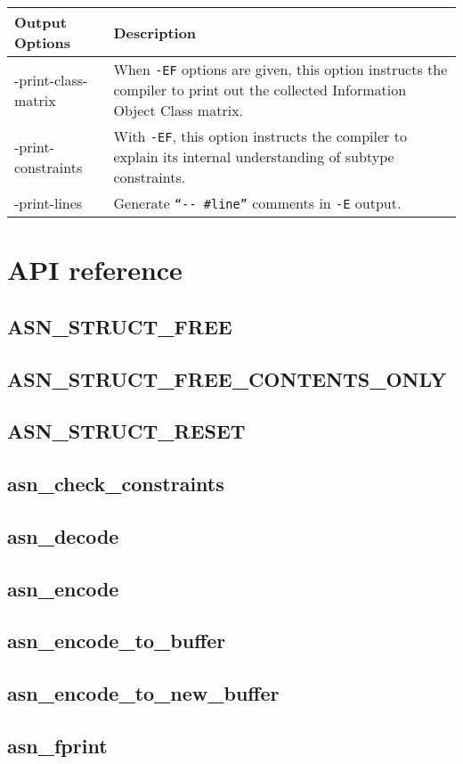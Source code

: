 \documentclass[english,oneside,12pt]{book}
\begin{document}
\begin{longtable}{lp{4in}}
\textbf{Output Options} & \textbf{Description}\\
\midrule
{\ttfamily -print-class-matrix} & {\small When \texttt{-EF} options are given, this option instructs the compiler to print out the collected Information Object Class matrix.}\\
{\ttfamily -print-constraints} & {\small With \texttt{-EF}, this option instructs the compiler
to explain its internal understanding of subtype constraints.}\\
{\ttfamily -print-lines} & {\small Generate \texttt{``-{}- \#line''} comments
in \texttt{-E} output.}\\
\end{longtable}
\renewcommand{\arraystretch}{1}


\chapter{API reference}

\section{ASN\_STRUCT\_FREE}
\section{ASN\_STRUCT\_FREE\_CONTENTS\_ONLY}
\section{ASN\_STRUCT\_RESET}
\section{asn\_check\_constraints}
\section{asn\_decode}
\section{asn\_encode}
\section{asn\_encode\_to\_buffer}
\section{asn\_encode\_to\_new\_buffer}
\section{asn\_fprint}
\end{document}
